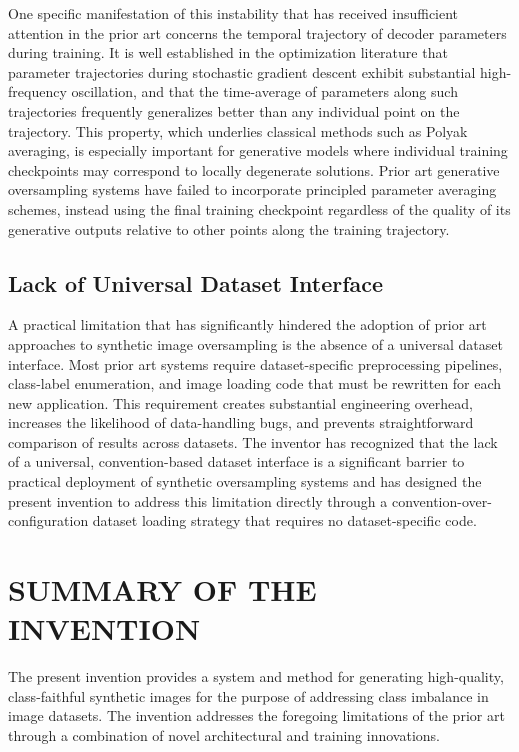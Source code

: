 \documentclass[12pt,letterpaper]{article}
\begin{document}
One specific manifestation of this instability that has received insufficient
attention in the prior art concerns the temporal trajectory of decoder
parameters during training. It is well established in the optimization
literature that parameter trajectories during stochastic gradient descent
exhibit substantial high-frequency oscillation, and that the time-average of
parameters along such trajectories frequently generalizes better than any
individual point on the trajectory. This property, which underlies classical
methods such as Polyak averaging, is especially important for generative models
where individual training checkpoints may correspond to locally degenerate
solutions. Prior art generative oversampling systems have failed to incorporate
principled parameter averaging schemes, instead using the final training
checkpoint regardless of the quality of its generative outputs relative to
other points along the training trajectory.

\subsection{Lack of Universal Dataset Interface}

A practical limitation that has significantly hindered the adoption of prior
art approaches to synthetic image oversampling is the absence of a universal
dataset interface. Most prior art systems require dataset-specific preprocessing
pipelines, class-label enumeration, and image loading code that must be
rewritten for each new application. This requirement creates substantial
engineering overhead, increases the likelihood of data-handling bugs, and
prevents straightforward comparison of results across datasets. The inventor
has recognized that the lack of a universal, convention-based dataset interface
is a significant barrier to practical deployment of synthetic oversampling
systems and has designed the present invention to address this limitation
directly through a convention-over-configuration dataset loading strategy that
requires no dataset-specific code.

\section*{SUMMARY OF THE INVENTION}

The present invention provides a system and method for generating high-quality,
class-faithful synthetic images for the purpose of addressing class imbalance
in image datasets. The invention addresses the foregoing limitations of the
prior art through a combination of novel architectural and training innovations.
\end{document}

